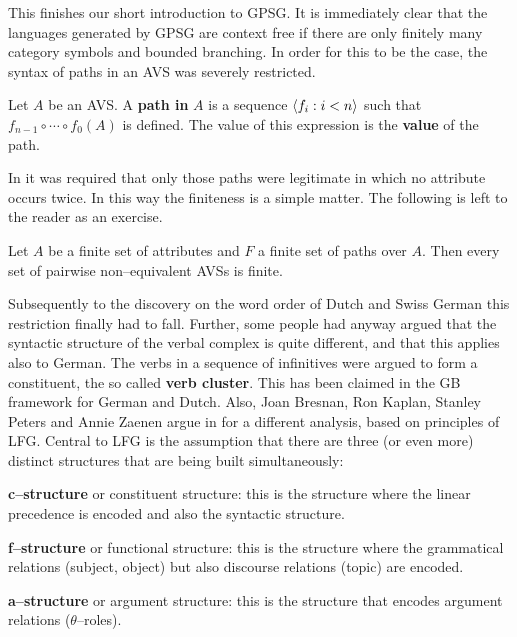 This finishes our short introduction to GPSG. It is immediately
clear that the languages generated by GPSG are context free
if there are only finitely many category symbols and bounded 
branching. In order for this to be the case, the syntax of paths 
in an AVS was severely restricted.
\begin{defn}
Let $A$ be an AVS. A \textbf{path in} $A$ is a sequence
$\langle f_i : i < n\rangle$ such that $f_{n-1} \circ \dotsb \circ f_0(A)$
is defined. The value of this expression is the \textbf{value} of the
path.
\end{defn}
In \cite{gazdarpullumsag:gpsg} it was required that only those paths
were legitimate in which no attribute occurs twice. In this way the
finiteness is a simple matter. The following is left to the reader
as an exercise.
\begin{prop}
\label{prop:endkat}
Let $A$ be a finite set of attributes and $F$ a finite set of paths
over $A$. Then every set of pairwise non--equivalent AVSs is finite.
\end{prop}
Subsequently to the discovery on the word order of Dutch and Swiss
German this restriction finally had to fall. Further, some people
had anyway argued that the syntactic structure of the verbal complex
is quite different, and that this applies also to German. The verbs
in a sequence of infinitives were argued to form a constituent, the
so called
\textbf{verb cluster}. This has been claimed in the GB framework for
German and Dutch. 
Also, Joan Bresnan, Ron Kaplan, Stanley Peters and Annie Zaenen 
argue in 
for a different analysis, based on principles of LFG. Central to LFG 
is the assumption that there are three (or even more) distinct 
structures that are being built simultaneously:
\begin{dinglist}{43}
\item
\textbf{c--structure} or constituent structure: this is the structure
where the linear precedence is encoded and also the syntactic
structure.
\item
\textbf{f--structure} or functional structure: this is the structure
where the grammatical relations (subject, object) but also
discourse relations (topic) are encoded.
\item
\textbf{a--structure} or argument structure: this is the structure
that encodes argument relations ($\theta$--roles).
\end{dinglist}
